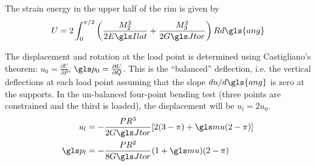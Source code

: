 \documentclass[../../thesis.tex]{subfiles}
\begin{document}
The strain energy in the upper half of the rim is given by
\begin{equation}
U = 2\int_0^{\pi/2} \left( \frac{M_2^2}{2\EIl} +\frac{M_3^2}{2\GJ} \right) R d\gls{ang}
\end{equation}

The displacement and rotation at the load point is determined using Castigliano's theorem: $u_0 = \frac{\partial U}{\partial P}$, $\p_0 = \frac{\partial U}{\partial Q}$. This is the ``balanced'' deflection, i.e. the vertical deflections at each load point assuming that the slope $du/d\gls{ang}$ is zero at the supports. In the un-balanced four-point bending test (three points are constrained and the third is loaded), the displacement will be $u_l=2u_0$.
\begin{gather}
\begin{align}
u_l  &= -\frac{PR^3}{2\GJ}[2(3-\pi) + \m(2-\pi)]\\
\p_l &= -\frac{PR^2}{8\GJ}(1+\m)(2-\pi)
\end{align}
\end{gather}
\end{document}
